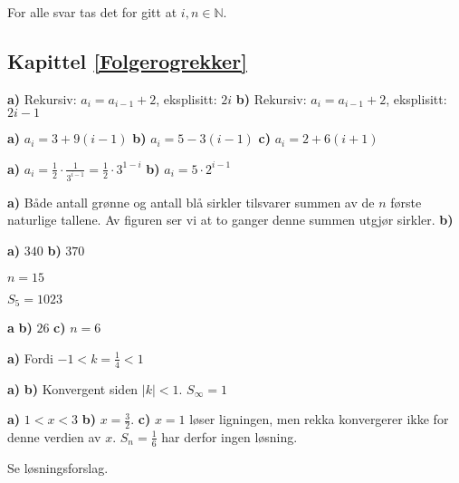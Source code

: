 




\footnotesize

For alle svar tas det for gitt at $ i,n\in\mathbb{N} $.

\subsection*{Kapittel \ref{Folgerogrekker}}
\textbf{a)} Rekursiv: $ {a_i=a_{i-1}+2 }$, eksplisitt: $ 2i $
\textbf{b)} Rekursiv: $ {a_i=a_{i-1}+2 }$, eksplisitt: $ {2i-1} $

\textbf{a)} $ a_i = 3+9(i-1) $
\textbf{b)} $ a_i=5-3(i-1) $
\textbf{c)} $ a_i = 2+6(i+1) $

\textbf{a)} $ a_i = \frac{1}{2}\cdot\frac{1}{3^{i-1}}=\frac{1}{2}\cdot3^{1-i} $
\textbf{b)} $ a_i = 5\cdot2^{i-1}  $

 \textbf{a)} Både antall grønne og antall blå sirkler tilsvarer summen av de $ n $ første naturlige tallene. Av figuren ser vi at to ganger denne summen utgjør  sirkler. \textbf{b)} \selos

\textbf{a)} $ 340 $
\textbf{b)} $ 370 $

$ n=15 $

 \selos

$ S_5=1023 $


\textbf{a} \selos
\textbf{b)} $ 26 $
\textbf{c)} $ n=6 $



\textbf{a)} Fordi $ -1<k=\frac{1}{4}<1 $

\begin{comment}
	\opr{stav}
Lengden blir $ \frac{10}{9} $ m.
\end{comment}
 \textbf{a)}  \textbf{b)} Konvergent siden $ |k|<1 $. $ S_\infty=1 $

\textbf{a)} $ 1<x<3 $
\textbf{b)} $ x=\frac{3}{2} $.
\textbf{c)} $ x=1 $ løser ligningen, men rekka konvergerer ikke for denne verdien av $ x $. $ S_n=\frac{1}{6} $ har derfor ingen løsning.

 Se løsningsforslag.

 \selos

 \selos
